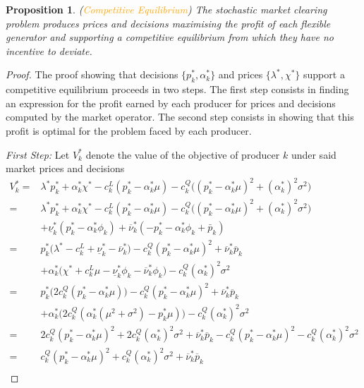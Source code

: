 \documentclass{article}
\newtheorem{proposition}{Proposition}
\begin{document}
\begin{proposition}
(\textcolor{orange}{Competitive Equilibrium}) The stochastic market clearing problem produces prices and decisions maximising the profit of each flexible generator and supporting a competitive equilibrium from which they have no incentive to deviate.
\end{proposition}
\begin{proof}
The proof showing that decisions $\{p_k^*, \alpha_k^*\}$ and prices $\{\lambda^*, \chi^*\}$ support a competitive equilibrium proceeds in two steps. The first step consists in finding an expression for the profit earned by each producer for prices and decisions computed by the market operator. The second step consists in showing that this profit is optimal for the problem faced by each producer.

\textit{First Step:} Let $V_k^*$ denote the value of the objective of producer $k$ under said market prices and decisions
\begin{align*}
    V_k^* =& \lambda^*p_k^* + \alpha_k^*\chi^* - c_k^L(p_k^* - \alpha_k^* \mu) - c_k^Q\big((p_k^* - \alpha_k^* \mu)^2 + (\alpha_k^*)^2\sigma^2\big) \\
    =& \lambda^*p_k^* + \alpha_k^*\chi^* - c_k^L(p_k^* - \alpha_k^* \mu) - c_k^Q\big((p_k^* - \alpha_k^* \mu)^2 + (\alpha_k^*)^2\sigma^2\big)\\
    & + \underline{\nu}_k^* (p_k^* - \alpha_k^* \phi_k) + \overline{\nu}_k^*(-p_k^* - \alpha_k^* \phi_k + \bar{p}_k)\\
    =& p_k^*\big(\lambda^* - c_k^L + \underline{\nu}_k^* - \overline{\nu}_k^*\big) - c_k^Q(p_k^* - \alpha_k^* \mu)^2 + \overline{\nu}_k^* \overline{p}_k\\
    &+ \alpha_k^*\big(\chi^* + c_k^L \mu - \underline{\nu}_k^* \phi_k - \overline{\nu}_k^* \phi_k\big) - c_k^Q (\alpha_k^*)^2 \sigma^2 \\
    =& p_k^*\big(2c_k^Q(p_k^* - \alpha_k^* \mu)\big) - c_k^Q(p_k^* - \alpha_k^* \mu)^2 + \overline{\nu}_k^* \overline{p}_k\\ 
    &+ \alpha_k^*\big(2c_k^Q(\alpha_k^*(\mu^2+\sigma^2) - p_k^* \mu)\big) - c_k^Q (\alpha_k^*)^2 \sigma^2\\
    =& 2c_k^Q(p_k^* - \alpha_k^* \mu)^2 + 2c_k^Q (\alpha_k^*)^2 \sigma^2 + \overline{\nu}_k^* \overline{p}_k - c_k^Q(p_k^* - \alpha_k^* \mu)^2 - c_k^Q (\alpha_k^*)^2 \sigma^2\\
    =& c_k^Q(p_k^* - \alpha_k^* \mu)^2 + c_k^Q (\alpha_k^*)^2 \sigma^2 + \overline{\nu}_k^* \overline{p}_k\\

\end{align*}
\end{proof}
\end{document}
